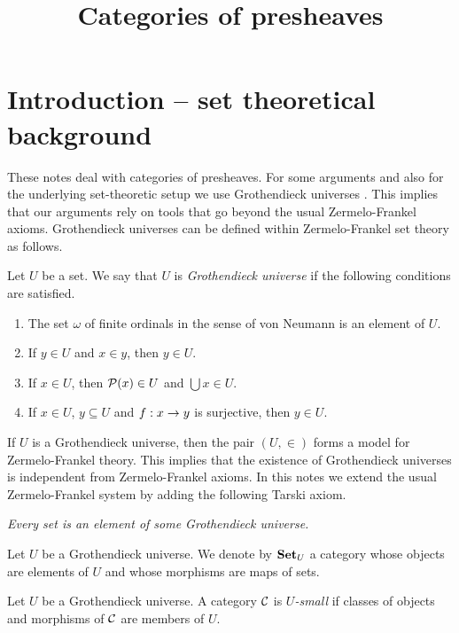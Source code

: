 



\title{Categories of presheaves}
\date{}
\maketitle

\section{Introduction -- set theoretical background}\label{section:introduction}
\noindent
These notes deal with categories of presheaves. For some arguments and also for the underlying set-theoretic setup we use Grothendieck universes {\cite[page 22]{Maclane}}. This implies that our arguments rely on tools that go beyond the usual Zermelo-Frankel axioms. Grothendieck universes can be defined within Zermelo-Frankel set theory as follows.

\begin{definition}
Let $U$ be a set. We say that $U$ is \textit{Grothendieck universe} if the following conditions are satisfied.
\begin{enumerate}[label=\textbf{(\arabic*)}, leftmargin=1.5em]
\item The set $\omega$ of finite ordinals in the sense of von Neumann is an element of $U$.
\item If $y\in U$ and $x\in y$, then $y\in U$.
\item If $x\in U$, then ${\mathcal P}(x)\in U$ and $\bigcup x\in U$.
\item If $x\in U$, $y\subseteq U$ and $f:x\rightarrow y$ is surjective, then $y\in U$.
\end{enumerate}
\end{definition}
\noindent
If $U$ is a Grothendieck universe, then the pair $(U,\in)$ forms a model for Zermelo-Frankel theory. This implies that the existence of Grothendieck universes is independent from Zermelo-Frankel axioms. In this notes we extend the usual Zermelo-Frankel system by adding the following Tarski axiom.
\begin{center}
\textit{Every set is an element of some Grothendieck universe.}
\end{center}
Let $U$ be a Grothendieck universe. We denote by $\mathbf{Set}_U$ a category whose objects are elements of $U$ and whose morphisms are maps of sets. 

\begin{definition}
Let $U$ be a Grothendieck universe. A category ${\mathcal C}$ is \textit{$U$-small} if classes of objects and morphisms of ${\mathcal C}$ are members of $U$.
\end{definition}

